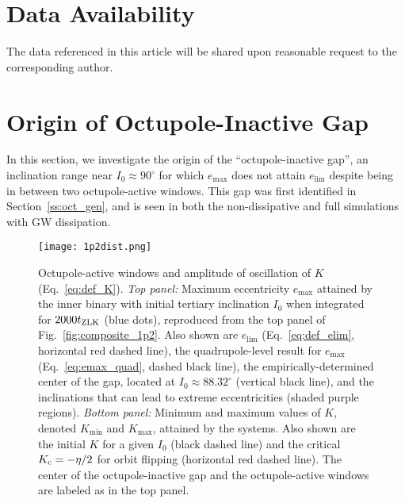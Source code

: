 \documentclass[
        fleqn,
        usenatbib,
    ]{mnras}
\begin{document}
\section{Data Availability}

The data referenced in this article will be shared upon reasonable request to
the corresponding author.




\clearpage
\onecolumn

\appendix

\section{Origin of Octupole-Inactive Gap}\label{app:gap}

In this section, we investigate the origin of the ``octupole-inactive gap'', an
inclination range near $I_0 \approx 90^\circ$ for which $e_{\max}$ does not
attain $e_{\lim}$ despite being in between two octupole-active windows. This gap
was first identified in Section~\ref{ss:oct_gen}, and is seen in both the
non-dissipative and full simulations with GW dissipation.

\begin{figure}
    \centering
    \texttt{[image: 1p2dist.png]}
    \caption{Octupole-active windows and amplitude of oscillation of $K$
    (Eq.~\ref{eq:def_K}). \emph{Top panel:} Maximum eccentricity $e_{\max}$
    attained by the inner binary with initial tertiary inclination $I_0$ when
    integrated for $2000 t_{\rm ZLK}$ (blue dots), reproduced from the top panel
    of Fig.~\ref{fig:composite_1p2}. Also shown are $e_{\lim}$
    (Eq.~\ref{eq:def_elim}, horizontal red dashed line), the quadrupole-level
    result for $e_{\max}$ (Eq.~\ref{eq:emax_quad}, dashed black line), the
    empirically-determined center of the gap, located at $I_0 \approx
    88.32^\circ$ (vertical black line), and the inclinations that can lead to
    extreme eccentricities (shaded purple regions). \emph{Bottom panel:} Minimum and maximum
    values of $K$, denoted $K_{\min}$ and $K_{\max}$, attained by the systems.
    Also shown are the initial $K$ for a given $I_0$ (black dashed line) and the
    critical $K_{\rm c} = -\eta / 2$ for orbit flipping (horizontal red dashed
    line). The center of the octupole-inactive gap and the octupole-active
    windows are labeled as in the top panel.
    }\label{fig:kdist}
\end{figure}
\end{document}
